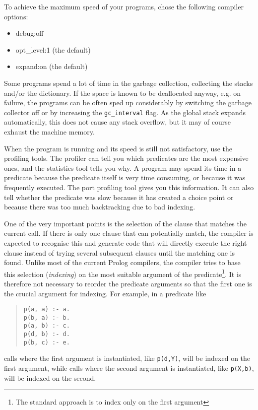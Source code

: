 To achieve the maximum speed of your programs, chose the following compiler
options:
\begin{itemize}
\item debug:off
\item opt_level:1 (the default)
\item expand:on (the default)
\end{itemize}
Some programs spend a lot of time in the garbage collection,
collecting the stacks and/or the dictionary.
If the space is known to be deallocated anyway, e.g. on failure,
the programs can be often sped up considerably
by switching the garbage collector off or by increasing
the {\tt gc_interval} flag.
As the global stack expands automatically, this does not cause
any stack overflow, but it may of course exhaust the machine memory.

When the program is running and its speed is still
not satisfactory, use the profiling tools.
The profiler can tell you which predicates
are the most expensive ones, and the statistics tool
tells you why.
A program may spend its time in a predicate because the predicate
itself is very time consuming, or because it was frequently executed.
The port profiling tool gives you this information.
It can also tell whether the predicate was slow because it
has created a choice point or because there was too much
backtracking due to bad indexing.

One of the very important points is the selection
of the clause that matches the current call.
If there is only one clause that can potentially match,
the compiler is expected to recognise this and generate code
that will directly execute the right clause
instead of trying several subsequent clauses until the
matching one is found.
Unlike most of the current Prolog compilers, the {\eclipse}
compiler tries to base this selection ({\it indexing}) on the most suitable
argument of the predicate\footnote{The standard approach
is to index only on the first argument}.
It is therefore not necessary to reorder the predicate
arguments so that the first one is the crucial argument
for indexing. For example, in a predicate like
\begin{quote}
\begin{verbatim}
p(a, a) :- a.
p(b, a) :- b.
p(a, b) :- c.
p(d, b) :- d.
p(b, c) :- e.
\end{verbatim}
\end{quote}
calls where the first argument is instantiated, like {\tt p(d,Y)}, will be
indexed on the first argument, while calls where the second argument is
instantiated, like {\tt p(X,b)}, will be indexed on the second.

